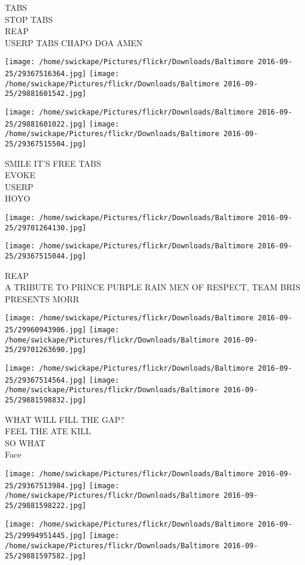 \documentclass[10pt,letterpaper]{article}
\begin{document}
TABS\\
STOP TABS\\
REAP\\
USERP TABS CHAPO DOA AMEN
\pagebreak

\texttt{[image: /home/swickape/Pictures/flickr/Downloads/Baltimore 2016-09-25/29367516364.jpg]}
\texttt{[image: /home/swickape/Pictures/flickr/Downloads/Baltimore 2016-09-25/29881601542.jpg]}

\texttt{[image: /home/swickape/Pictures/flickr/Downloads/Baltimore 2016-09-25/29881601022.jpg]}
\texttt{[image: /home/swickape/Pictures/flickr/Downloads/Baltimore 2016-09-25/29367515504.jpg]}

SMILE IT'S FREE TABS\\
EVOKE\\
USERP\\
HOYO
\pagebreak

\texttt{[image: /home/swickape/Pictures/flickr/Downloads/Baltimore 2016-09-25/29701264130.jpg]}

\vspace{0.25in}
\texttt{[image: /home/swickape/Pictures/flickr/Downloads/Baltimore 2016-09-25/29367515044.jpg]}

REAP\\
A TRIBUTE TO PRINCE PURPLE RAIN MEN OF RESPECT, TEAM BRIS PRESENTS MORR
\pagebreak

\texttt{[image: /home/swickape/Pictures/flickr/Downloads/Baltimore 2016-09-25/29960943906.jpg]}
\texttt{[image: /home/swickape/Pictures/flickr/Downloads/Baltimore 2016-09-25/29701263690.jpg]}

\texttt{[image: /home/swickape/Pictures/flickr/Downloads/Baltimore 2016-09-25/29367514564.jpg]}
\texttt{[image: /home/swickape/Pictures/flickr/Downloads/Baltimore 2016-09-25/29881598832.jpg]}

WHAT WILL FILL THE GAP?\\
FEEL THE ATE KILL\\
SO WHAT\\
Face
\pagebreak

\texttt{[image: /home/swickape/Pictures/flickr/Downloads/Baltimore 2016-09-25/29367513984.jpg]}
\texttt{[image: /home/swickape/Pictures/flickr/Downloads/Baltimore 2016-09-25/29881598222.jpg]}

\texttt{[image: /home/swickape/Pictures/flickr/Downloads/Baltimore 2016-09-25/29994951445.jpg]}
\texttt{[image: /home/swickape/Pictures/flickr/Downloads/Baltimore 2016-09-25/29881597582.jpg]}
\end{document}
